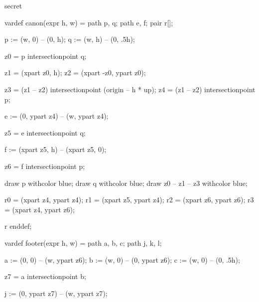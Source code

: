 



\startenvironment secret

	\setuppagenumbering[alternative=doublesided]

	\startMPdefinitions
		vardef canon(expr h, w) =
			path p, q;
			path e, f;
			pair r[];

			p := (w, 0) -- (0,   h);
			q := (w, h) -- (0, .5h);

			z0 = p intersectionpoint q; %

			z1 = (xpart  z0, h); %
			z2 = (xpart -z0, ypart z0); %

			z3 = (z1 -- z2) intersectionpoint (origin -- h * up); %
			z4 = (z1 -- z2) intersectionpoint p; %

			e := (0, ypart z4) -- (w, ypart z4);

			z5 = e intersectionpoint q; %

			f := (xpart z5, h) -- (xpart z5, 0);

			z6 = f intersectionpoint p; %

			draw p withcolor blue;
			draw q withcolor blue;
			draw z0 -- z1 -- z3 withcolor blue;

			r0 = (xpart z4, ypart z4); %
			r1 = (xpart z5, ypart z4); %
			r2 = (xpart z6, ypart z6); %
			r3 = (xpart z4, ypart z6); %

			r
		enddef;

		vardef footer(expr h, w) =
			path a, b, c;
			path j, k, l;

			a := (0, 0) -- (w, ypart z6);
			b := (w, 0) -- (0, ypart z6);
			c := (w, 0) -- (0, .5h);

			z7 = a intersectionpoint b; %

			j := (0, ypart z7) -- (w, ypart z7);

